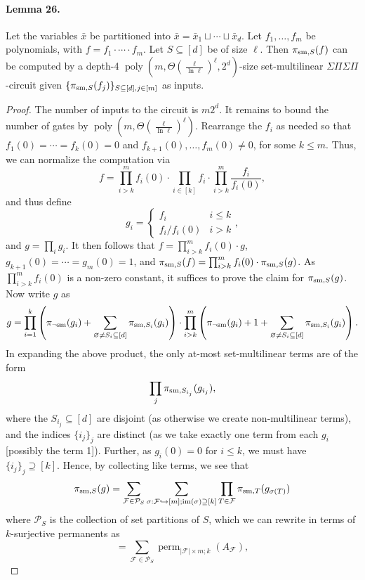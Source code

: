 \paragraph{Lemma 26.} Let the variables $\bar x$ be partitioned into $\bar x=\bar x_1\sqcup\cdots\sqcup\bar x_d$. Let $f_1,\ldots,f_m$ be polynomials, with $f=f_1\cdot\cdots\cdot f_m$. Let $S\subseteq[d]$ be of size $\ell$. Then $\pi_{{\rm sm},S}(f)$ can be computed by a depth-4 $\operatorname{poly}(m,\Theta(\frac\ell{\ln\ell})^\ell,2^d)$-size set-multilinear $\Sigma\Pi\Sigma\Pi$-circuit given $\{\pi_{{\rm sm},S}(f_j)\}_{S\subseteq[d],j\in[m]}$ as inputs.
\begin{proof}
The number of inputs to the circuit is $m2^d$. It remains to bound the number of gates by $\operatorname{poly}(m,\Theta(\frac\ell{\ln\ell})^\ell)$.
Rearrange the $f_i$ as needed so that $f_1(0)=\cdots=f_k(0)=0$ and $f_{k+1}(0),\ldots,f_m(0)\ne0$, for some $k\le m$. Thus, we can normalize the computation via
\[f=\prod_{i>k}^m f_i(0)\cdot\prod_{i\in[k]}f_i\cdot\prod_{i>k}^m\frac{f_i}{f_i(0)},\]
and thus define
\[g_i=\begin{cases}f_i&i\le k\\f_i/f_i(0)&i>k\end{cases},\]
and $g=\prod_i g_i$. It then follows that $f=\prod_{i>k}^m f_i(0)\cdot g$, $g_{k+1}(0)=\cdots=g_m(0)=1$, and $\pi_{{\rm sm},S}(f)=\prod_{i>k}^m f_i(0)\cdot\pi_{{\rm sm},S}(g)$. As $\prod_{i>k}^m f_i(0)$ is a non-zero constant, it suffices to prove the claim for $\pi_{{\rm sm},S}(g)$.
Now write $g$ as
\[g=\prod_{i=1}^k\left(\pi_{\neg{\rm sm}}(g_i)+\sum_{\varnothing\ne S_i\subseteq[d]}\pi_{{\rm sm},S_i}(g_i)\right)\cdot\prod_{i>k}^m\left(\pi_{\neg{\rm sm}}(g_i)+1+\sum_{\varnothing\ne S_i\subseteq[d]}\pi_{{\rm sm},S_i}(g_i)\right).\]
In expanding the above product, the only at-most set-multilinear terms are of the form
\[\prod_j\pi_{{\rm sm},S_{i_j}}(g_{i_j}),\]
where the $S_{i_j}\subseteq[d]$ are disjoint (as otherwise we create non-multilinear terms), and the indices $\{i_j\}_j$ are distinct (as we take exactly one term from each $g_i$ [possibly the term 1]).
Further, as $g_i(0)=0$ for $i\le k$, we must have $\{i_j\}_j\supseteq[k]$. Hence, by collecting like terms, we see that
\[\pi_{{\rm sm},S}(g)=\sum_{\mathcal F\in\mathcal P_S}\sum_{\sigma:\mathcal F\hookrightarrow[m];\operatorname{im}(\sigma)\supseteq[k]}\prod_{T\in\mathcal F}\pi_{{\rm sm},T}(g_{\sigma(T)})\]
where $\mathcal P_S$ is the collection of set partitions of $S$, which we can rewrite in terms of $k$-surjective permanents as
\[=\sum_{\mathcal F\in\mathcal P_S}\operatorname{perm}_{|\mathcal F|\times m;k}(A_{\mathcal F}),\]

\end{proof}
